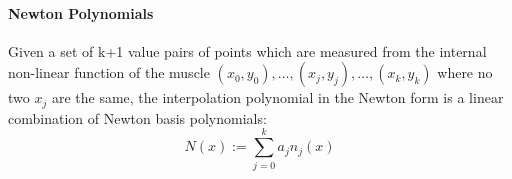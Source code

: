 \documentclass[main]{subfiles}
\begin{document}
\begin{comment}
\paragraph{Lagrange polynomials}
Using the Lagrange polynomials, the approximation of the control function would be built the following:
Given a set of $k+ 1$ value pairs of points which are measured from the internal non-linear contraction function of the muscle $(x_0, y_0),\ldots,(x_j, y_j),\ldots,(x_k, y_k)$ where no two $x_j$ are the same, we try to approximate the internal function by using Lagrange polynomials. The interpolation is a linear combination:
\[
\begin{aligned}
L(x) &:= \sum_{j=0}^{k} y_j \ell_j(x)
\end{aligned}
\]
of Lagrange basis polynomials:
\[
\begin{aligned}
\ell_j(x) &:= \prod_{\begin{smallmatrix}0\le m\le k\\ m\neq j\end{smallmatrix}} \frac{x-x_m}{x_j-x_m} = \frac{(x-x_0)}{(x_j-x_0)} \cdots \frac{(x-x_{j-1})}{(x_j-x_{j-1})} \frac{(x-x_{j+1})}{(x_j-x_{j+1})} \cdots \frac{(x-x_k)}{(x_j-x_k)},
\end{aligned}
\]
where $0\le j\le k$. Note how, given the initial assumption that no two $x_i$ are the same, $x_j - x_m \neq 0$, so this expression is always well-defined.

For all $j\neq i$, $\ell_j(x)$ includes the term $(x-x_i)$ in the numerator, so the whole product will be zero at $x=x_i$:
\[
\ell_{j\ne i}(x_i) = \prod_{m\neq j} \frac{x_i-x_m}{x_j-x_m} = \frac{(x_i-x_0)}{(x_j-x_0)} \cdots \frac{(x_i-x_i)}{(x_j-x_i)} \cdots \frac{(x_i-x_k)}{(x_j-x_k)} = 0\]

On the other hand:

\[
\ell_i(x_i) := \prod_{m\neq i} \frac{x_i-x_m}{x_i-x_m} = 1
\]

In other words, all basis polynomials are zero at $x=x_i$, except $\ell_i(x)$, for which it holds that $\ell_i(x_i)= 1$, because it lacks the $(x-x_i)$ term.

It follows that $y_i \ell_i(x_i)=y_i$, so at each point $x_i$, $L(x_i)=y_i+0+0+\dots +0=y_i$, showing that $L$ interpolates the function exactly.

\end{comment}
\paragraph{Newton Polynomials}
Given a set of k+1 value pairs of points which are measured from the internal non-linear function of the muscle $(x_0, y_0),\ldots,(x_j, y_j),\ldots,(x_k, y_k)$ where no two $x_j$ are the same, the interpolation polynomial in the Newton form is a linear combination of Newton basis polynomials:
\[N(x) := \sum_{j=0}^{k} a_{j} n_{j}(x)\]
\end{document}
